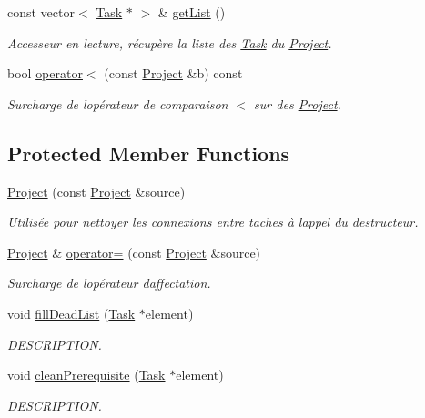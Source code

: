 \begin{DoxyCompactItemize}
const vector$<$ \hyperlink{class_task}{Task} $\ast$ $>$ \& \hyperlink{class_project_a7bdf3e97406af34802af38d62b9ed57e}{get\+List} ()
\begin{DoxyCompactList}\small\item\em Accesseur en lecture, récupère la liste des \hyperlink{class_task}{Task} du \hyperlink{class_project}{Project}. \end{DoxyCompactList}\item 
bool \hyperlink{class_project_ad491ada968c4188902ee08ce5f8382d2}{operator$<$} (const \hyperlink{class_project}{Project} \&b) const 
\begin{DoxyCompactList}\small\item\em Surcharge de l\textquotesingle{}opérateur de comparaison $<$ sur des \hyperlink{class_project}{Project}. \end{DoxyCompactList}\end{DoxyCompactItemize}
\subsection*{Protected Member Functions}
\begin{DoxyCompactItemize}
\item 
\hyperlink{class_project_ac751c4c639ce89861c3b67921e439810}{Project} (const \hyperlink{class_project}{Project} \&source)
\begin{DoxyCompactList}\small\item\em Utilisée pour nettoyer les connexions entre taches à l\textquotesingle{}appel du destructeur. \end{DoxyCompactList}\item 
\hyperlink{class_project}{Project} \& \hyperlink{class_project_a2bdbeb52dc721131dd0d3d0bf3568236}{operator=} (const \hyperlink{class_project}{Project} \&source)
\begin{DoxyCompactList}\small\item\em Surcharge de l\textquotesingle{}opérateur d\textquotesingle{}affectation. \end{DoxyCompactList}\item 
void \hyperlink{class_project_a384c1f9e26ce142d5c04f1694947120a}{fill\+Dead\+List} (\hyperlink{class_task}{Task} $\ast$element)
\begin{DoxyCompactList}\small\item\em D\+E\+S\+C\+R\+I\+P\+T\+I\+O\+N. \end{DoxyCompactList}\item 
void \hyperlink{class_project_a2074003bbe370ea1b8db6f7cdfae2b28}{clean\+Prerequisite} (\hyperlink{class_task}{Task} $\ast$element)
\begin{DoxyCompactList}\small\item\em D\+E\+S\+C\+R\+I\+P\+T\+I\+O\+N. \end{DoxyCompactList}\end{DoxyCompactItemize}
